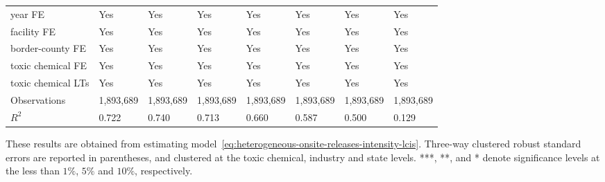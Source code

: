 \begin{table}[H]
{\begin{tabular}{@{}llllllll@{}}
            year FE                               & Yes       & Yes           & Yes       & Yes          & Yes             & Yes           & Yes                 \\
            facility FE                           & Yes       & Yes           & Yes       & Yes          & Yes             & Yes           & Yes                 \\
            border-county FE                      & Yes       & Yes           & Yes       & Yes          & Yes             & Yes           & Yes                 \\
            toxic chemical FE                     & Yes       & Yes           & Yes       & Yes          & Yes             & Yes           & Yes                 \\
            toxic chemical LTs                    & Yes       & Yes           & Yes       & Yes          & Yes             & Yes           & Yes                 \\ \midrule
            Observations                          & 1,893,689 & 1,893,689     & 1,893,689 & 1,893,689    & 1,893,689       & 1,893,689     & 1,893,689           \\
            $R^2$                                 & 0.722     & 0.740         & 0.713     & 0.660        & 0.587           & 0.500         & 0.129               \\ \bottomrule\bottomrule
        \end{tabular}%
    }
    \begin{minipage}{18cm}
        \vspace{0.05in}
        These results are obtained from estimating model~\ref{eq:heterogeneous-onsite-releases-intensity-lcis}. Three-way clustered robust standard errors are reported in parentheses, and clustered at the toxic chemical, industry and state levels. ***, **, and * denote significance levels at the less than $1\%$, $5\%$ and $10\%$, respectively.
    \end{minipage}
\end{table}